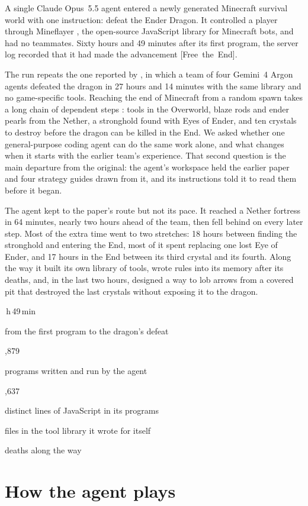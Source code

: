 \documentclass[11pt,a4paper]{article}
\newcommand{\statcell}[2]{%
  \begin{minipage}[t]{0.177\textwidth}\raggedright
    {\sffamily\fontsize{17}{20}\selectfont #1\par}\vspace{3pt}
    {\sffamily\fontsize{7}{8.6}\selectfont\color{inkgrey}#2\par}
  \end{minipage}}
\newcommand{\statsep}{\hspace{0.5em}{\color{rulegrey}\vrule width 0.6pt}\hspace{0.6em}}
\newcommand{\adv}[1]{\mbox{\textsf{[#1]}}}
\begin{document}
A single Claude Opus~5.5 agent entered a newly generated Minecraft survival world with one instruction: defeat the Ender Dragon. It controlled a player through Mineflayer \citep{mineflayer}, the open-source JavaScript library for Minecraft bots, and had no teammates. Sixty hours and 49 minutes after its first program, the server log recorded that it had made the advancement \adv{Free the End}.

The run repeats the one reported by \citet{faldor2026team}, in which a team of four Gemini~4 Argon agents defeated the dragon in 27 hours and 14 minutes with the same library and no game-specific tools. Reaching the end of Minecraft from a random spawn takes a long chain of dependent steps \citep{fan2022minedojo}: tools in the Overworld, blaze rods and ender pearls from the Nether, a stronghold found with Eyes of Ender, and ten crystals to destroy before the dragon can be killed in the End. We asked whether one general-purpose coding agent can do the same work alone, and what changes when it starts with the earlier team's experience. That second question is the main departure from the original: the agent's workspace held the earlier paper and four strategy guides drawn from it, and its instructions told it to read them before it began.

The agent kept to the paper's route but not its pace. It reached a Nether fortress in 64 minutes, nearly two hours ahead of the team, then fell behind on every later step. Most of the extra time went to two stretches: 18 hours between finding the stronghold and entering the End, most of it spent replacing one lost Eye of Ender, and 17 hours in the End between its third crystal and its fourth. Along the way it built its own library of tools, wrote rules into its memory after its deaths, and, in the last two hours, designed a way to lob arrows from a covered pit that destroyed the last crystals without exposing it to the dragon.

\vspace{10pt}
\noindent\statcell{60\,h\,49\,min}{from the first program to the dragon's defeat}%
\statsep\statcell{5,879}{programs written and run by the agent}%
\statsep\statcell{6,637}{distinct lines of JavaScript in its programs}%
\statsep\statcell{51}{files in the tool library it wrote for itself}%
\statsep\statcell{115}{deaths along the way}
\vspace{6pt}

\section{How the agent plays}
\end{document}
